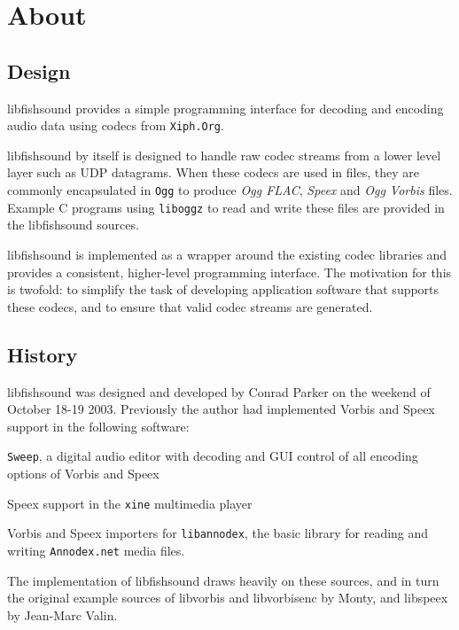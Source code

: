 \section{\-About}
\label{group__about}
\subsection{\-Design}\label{group__about_design}
libfishsound provides a simple programming interface for decoding and encoding audio data using codecs from {\tt \-Xiph.\-Org}.

libfishsound by itself is designed to handle raw codec streams from a lower level layer such as \-U\-D\-P datagrams. \-When these codecs are used in files, they are commonly encapsulated in {\tt \-Ogg} to produce {\itshape \-Ogg \-F\-L\-A\-C\/}, {\itshape \-Speex\/} and {\itshape \-Ogg \-Vorbis\/} files. \-Example \-C programs using {\tt liboggz} to read and write these files are provided in the libfishsound sources.

libfishsound is implemented as a wrapper around the existing codec libraries and provides a consistent, higher-\/level programming interface. \-The motivation for this is twofold\-: to simplify the task of developing application software that supports these codecs, and to ensure that valid codec streams are generated.\subsection{\-History}\label{group__about_history}
libfishsound was designed and developed by \-Conrad \-Parker on the weekend of \-October 18-\/19 2003. \-Previously the author had implemented \-Vorbis and \-Speex support in the following software\-:
\begin{DoxyItemize}
\item {\tt \-Sweep}, a digital audio editor with decoding and \-G\-U\-I control of all encoding options of \-Vorbis and \-Speex
\item \-Speex support in the {\tt xine} multimedia player
\item \-Vorbis and \-Speex importers for {\tt libannodex}, the basic library for reading and writing {\tt \-Annodex.\-net} media files.
\end{DoxyItemize}

\-The implementation of libfishsound draws heavily on these sources, and in turn the original example sources of libvorbis and libvorbisenc by \-Monty, and libspeex by \-Jean-\/\-Marc \-Valin.

